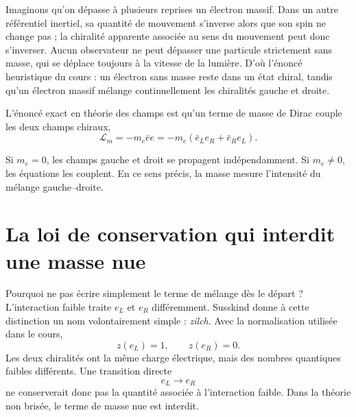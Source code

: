 Imaginons qu’on dépasse à plusieurs reprises un électron massif. Dans un autre référentiel inertiel, sa quantité de mouvement s’inverse alors que son spin ne change pas ; la chiralité apparente associée au sens du mouvement peut donc s’inverser. Aucun observateur ne peut dépasser une particule strictement sans masse, qui se déplace toujours à la vitesse de la lumière. D’où l’énoncé heuristique du cours : un électron sans masse reste dans un état chiral, tandis qu’un électron massif mélange continuellement les chiralités gauche et droite.

L’énoncé exact en théorie des champs est qu’un terme de masse de Dirac couple les deux champs chiraux,
\begin{equation}
\mathcal L_m
=
-m_e\bar e e
=
-m_e
\left(
  \bar e_L e_R
  +
  \bar e_R e_L
\right).
\end{equation}

Si $m_e=0$, les champs gauche et droit se propagent indépendamment. Si $m_e\ne0$, les équations les couplent. En ce sens précis, la masse mesure l’intensité du mélange gauche--droite.

\section{La loi de conservation qui interdit une masse nue}

Pourquoi ne pas écrire simplement le terme de mélange dès le départ ? L’interaction faible traite $e_L$ et $e_R$ différemment. Susskind donne à cette distinction un nom volontairement simple : \emph{zilch}. Avec la normalisation utilisée dans le cours,
\begin{equation}
z(e_L)=1,
\qquad
z(e_R)=0.
\end{equation}
Les deux chiralités ont la même charge électrique, mais des nombres quantiques faibles différents. Une transition directe
\begin{equation}
e_L\longrightarrow e_R
\end{equation}
ne conserverait donc pas la quantité associée à l’interaction faible. Dans la théorie non brisée, le terme de masse nue est interdit.


